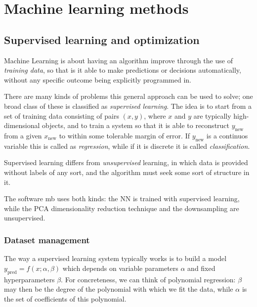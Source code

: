 \documentclass[main.tex]{subfiles}
\begin{document}
\chapter{Machine learning methods} \label{chap:ml}

\section{Supervised learning and optimization}

Machine Learning is about having an algorithm improve through the use of \emph{training data}, 
so that is it able to make predictions or decisions automatically, 
without any specific outcome being explicitly programmed in.

There are many kinds of problems this general approach can be used to solve; one broad class of these is classified as \emph{supervised learning}. 
The idea is to start from a set of training data consisting of pairs \((x, y)\), 
where \(x\) and \(y\) are typically high-dimensional objects, and to train a system so that 
it is able to reconstruct \(y _{\text{new}}\) from a given \(x _{\text{new}}\) to within some tolerable margin of error.
If \(y _{\text{new}}\) is a continuos variable this is called as \emph{regression}, while if it is discrete it is called \emph{classification}.

Supervised learning differs from \emph{unsupervised} learning, in which data is provided without labels of any sort, and the algorithm must seek some sort of structure in it.

The software \ac{mb} uses both kinds: the \ac{NN} is trained with supervised learning, while the \ac{PCA} dimensionality reduction technique and the downsampling are unsupervised. 

\subsection{Dataset management} \label{sec:dataset-management}

The way a supervised learning system typically works is to build a model \(y _{\text{pred}} = f(x; \alpha , \beta ) \) which depends on variable parameters \(\alpha \) and fixed hyperparameters \(\beta \).
For concreteness, we can think of polynomial regression: \(\beta \) may then be the degree of the polynomial with which we fit the data, while \(\alpha \) is the set of coefficients of this polynomial. 
\end{document}
